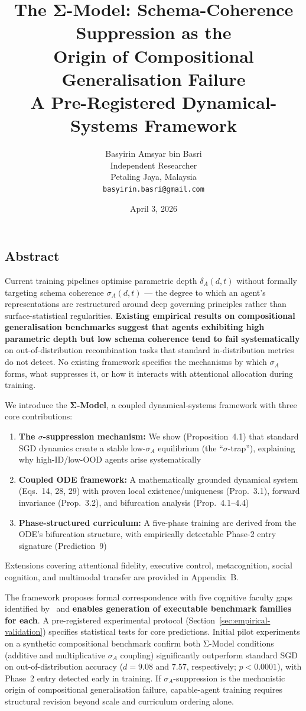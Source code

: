 \documentclass[11pt,a4paper]{article}
\title{\textbf{The Σ-Model: Schema-Coherence Suppression as the\\
Origin of Compositional Generalisation Failure}\\[6pt]
\large A Pre-Registered Dynamical-Systems Framework}
\author{
  Basyirin Amsyar bin Basri\\
  Independent Researcher\\
  Petaling Jaya, Malaysia\\
  \texttt{basyirin.basri@gmail.com}
}
\date{April 3, 2026}
\begin{document}
\maketitle

\subsection*{Abstract}

Current training pipelines optimise parametric depth $\delta_A(d,t)$
without formally targeting schema coherence $\sigma_A(d,t)$ --- the degree
to which an agent's representations are restructured around deep governing
principles rather than surface-statistical regularities.
\textbf{Existing empirical results on compositional generalisation
benchmarks suggest that agents exhibiting high parametric depth but
low schema coherence tend to fail systematically} on out-of-distribution
recombination tasks that standard in-distribution metrics do not detect.
No existing framework specifies the mechanisms by which $\sigma_A$ forms,
what suppresses it, or how it interacts with attentional allocation
during training.

We introduce the \textbf{Σ-Model}, a coupled dynamical-systems
framework with three core contributions:
\begin{enumerate}[nosep]
\item \textbf{The $\sigma$-suppression mechanism:} We show (Proposition~4.1) that standard SGD dynamics create a stable low-$\sigma_A$ equilibrium (the ``$\sigma$-trap''), explaining why high-ID/low-OOD agents arise systematically
\item \textbf{Coupled ODE framework:} A mathematically grounded dynamical system (Eqs.~14, 28, 29) with proven local existence/uniqueness (Prop.~3.1), forward invariance (Prop.~3.2), and bifurcation analysis (Prop.~4.1--4.4)
\item \textbf{Phase-structured curriculum:} A five-phase training arc derived from the ODE's bifurcation structure, with empirically detectable Phase-2 entry signature (Prediction~9)
\end{enumerate}
Extensions covering attentional fidelity, executive control, metacognition,
social cognition, and multimodal transfer are provided in Appendix~B.

The framework proposes formal correspondence with five cognitive
faculty gaps identified by~\cite{burnell2026measuringprogressagi} and
\textbf{enables generation of executable benchmark families for each}.
A pre-registered experimental protocol (Section~\ref{sec:empirical-validation})
specifies statistical tests for core predictions. Initial pilot experiments on
a synthetic compositional benchmark confirm both Σ-Model conditions (additive and multiplicative
$\sigma_A$ coupling) significantly outperform standard SGD on
out-of-distribution accuracy ($d = 9.08$ and $7.57$, respectively; $p < 0.0001$), with Phase~2
entry detected early in training. If $\sigma_A$-suppression is the
mechanistic origin of compositional generalisation failure, capable-agent
training requires structural revision beyond scale and curriculum
ordering alone.
\end{document}
